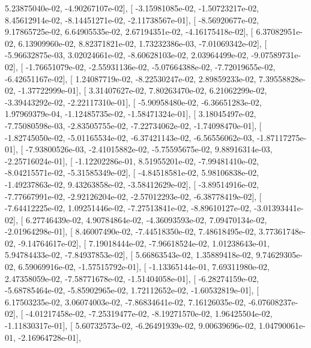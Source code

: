 \documentclass{article}
\begin{document}
          5.23875040e-02,  -4.90267107e-02],
       [ -3.15981085e-02,  -1.50723217e-02,   8.45612914e-02,
         -8.14451271e-02,  -2.11738567e-01],
       [ -8.56920677e-02,   9.17865725e-02,   6.64905535e-02,
          2.67194351e-02,  -4.16175418e-02],
       [  6.37082951e-02,   6.13909960e-02,   8.82371821e-02,
          1.73232386e-03,  -7.01069342e-02],
       [ -5.96632875e-03,   3.02024661e-02,  -8.60628103e-02,
          2.03964499e-02,  -9.07589731e-02],
       [ -1.76651079e-02,  -2.55931136e-02,  -5.07664388e-02,
         -7.72019655e-02,  -6.42651167e-02],
       [  1.24087719e-02,  -8.22530247e-02,   2.89859233e-02,
          7.39558828e-02,  -1.37722999e-01],
       [  3.31407627e-02,   7.80263470e-02,   6.21062299e-02,
         -3.39443292e-02,  -2.22117310e-01],
       [ -5.90958480e-02,  -6.36651283e-02,   1.97969379e-04,
         -1.12485735e-02,  -1.58471324e-01],
       [  3.18045497e-02,  -7.75080598e-03,  -2.83505755e-02,
         -7.22734062e-02,  -1.74098470e-01],
       [ -1.82745050e-02,  -5.01165534e-02,  -6.37421143e-02,
         -6.56556062e-03,  -1.87117275e-01],
       [ -7.93800526e-03,  -2.41015882e-02,  -5.75595675e-02,
          9.88916314e-03,  -2.25716024e-01],
       [ -1.12202286e-01,   8.51955201e-02,  -7.99481410e-02,
         -8.04215571e-02,  -5.31585349e-02],
       [ -4.84518581e-02,   5.98106838e-02,  -1.49237863e-02,
          9.43263858e-02,  -3.58412629e-02],
       [ -3.89514916e-02,  -7.77667991e-02,  -2.92126204e-02,
         -2.57012293e-02,  -6.38778419e-02],
       [ -7.64412225e-02,   1.09251446e-02,  -7.27513841e-02,
         -8.89610127e-02,  -3.01393441e-02],
       [  6.27746439e-02,   4.90784864e-02,  -4.36093593e-02,
          7.09470134e-02,  -2.01964298e-01],
       [  8.46007490e-02,  -7.44518350e-02,   7.48618495e-02,
          3.77361748e-02,  -9.14764617e-02],
       [  7.19018444e-02,  -7.96618524e-02,   1.01238643e-01,
          5.94784433e-02,  -7.84937853e-02],
       [  5.66863543e-02,   1.35889418e-02,   9.74629305e-02,
          6.59069916e-02,  -1.57515792e-01],
       [ -1.13365144e-01,   7.69311980e-02,   2.47358059e-02,
         -7.58771678e-02,  -1.51404058e-01],
       [ -6.28274159e-02,  -5.68785464e-02,  -5.85902965e-02,
          1.72112652e-02,  -1.60532819e-01],
       [  6.17503235e-02,   3.06074003e-02,  -7.86834641e-02,
          7.16126035e-02,  -6.07608237e-02],
       [ -4.01217458e-02,  -7.25319477e-02,  -8.19271570e-02,
          1.96425504e-02,  -1.11830317e-01],
       [  5.60732573e-02,  -6.26491939e-02,   9.00639696e-02,
          1.04790061e-01,  -2.16964728e-01],
\end{document}
